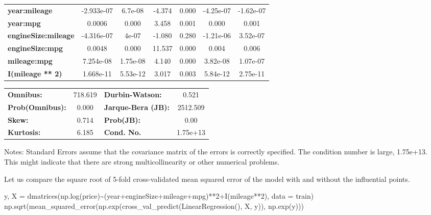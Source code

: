 \documentclass[
  letterpaper,
  DIV=11,
  numbers=noendperiod]{scrreprt}
\newenvironment{Shaded}{\begin{snugshade}}{\end{snugshade}}
\newcommand{\NormalTok}[1]{\textcolor[rgb]{0.00,0.23,0.31}{#1}}
\newcommand{\OperatorTok}[1]{\textcolor[rgb]{0.37,0.37,0.37}{#1}}
\newcommand{\StringTok}[1]{\textcolor[rgb]{0.13,0.47,0.30}{#1}}
\begin{document}
\begin{center}
\begin{tabular}{lcccccc}
\textbf{year:mileage}       &   -2.933e-07  &      6.7e-08     &    -4.374  &         0.000        &    -4.25e-07    &    -1.62e-07     \\
\textbf{year:mpg}           &       0.0006  &        0.000     &     3.458  &         0.001        &        0.000    &        0.001     \\
\textbf{engineSize:mileage} &   -4.316e-07  &        4e-07     &    -1.080  &         0.280        &    -1.21e-06    &     3.52e-07     \\
\textbf{engineSize:mpg}     &       0.0048  &        0.000     &    11.537  &         0.000        &        0.004    &        0.006     \\
\textbf{mileage:mpg}        &    7.254e-08  &     1.75e-08     &     4.140  &         0.000        &     3.82e-08    &     1.07e-07     \\
\textbf{I(mileage ** 2)}    &    1.668e-11  &     5.53e-12     &     3.017  &         0.003        &     5.84e-12    &     2.75e-11     \\
\bottomrule
\end{tabular}
\begin{tabular}{lclc}
\textbf{Omnibus:}       & 718.619 & \textbf{  Durbin-Watson:     } &    0.521  \\
\textbf{Prob(Omnibus):} &   0.000 & \textbf{  Jarque-Bera (JB):  } & 2512.509  \\
\textbf{Skew:}          &   0.714 & \textbf{  Prob(JB):          } &     0.00  \\
\textbf{Kurtosis:}      &   6.185 & \textbf{  Cond. No.          } & 1.75e+13  \\
\bottomrule
\end{tabular}
\end{center}

Notes: \newline
 [1] Standard Errors assume that the covariance matrix of the errors is correctly specified. \newline
 [2] The condition number is large, 1.75e+13. This might indicate that there are \newline
 strong multicollinearity or other numerical problems.

Let us compare the square root of 5-fold cross-validated mean squared
error of the model with and without the influential points.

\begin{Shaded}
\begin{Highlighting}[]
\NormalTok{y, X }\OperatorTok{=}\NormalTok{ dmatrices(}\StringTok{\textquotesingle{}np.log(price)\textasciitilde{}(year+engineSize+mileage+mpg)**2+I(mileage**2)\textquotesingle{}}\NormalTok{, data }\OperatorTok{=}\NormalTok{ train)}
\NormalTok{np.sqrt(mean\_squared\_error(np.exp(cross\_val\_predict(LinearRegression(), X, y)), np.exp(y)))}
\end{Highlighting}
\end{Shaded}
\end{document}
